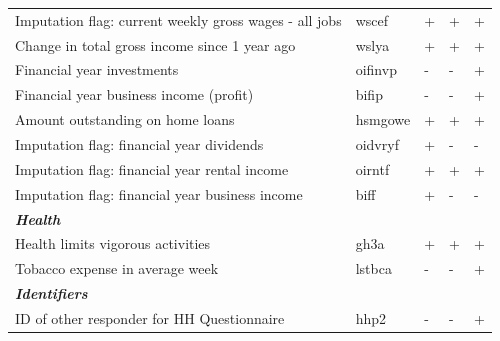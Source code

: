 \documentclass[12pt, a4paper]{article}
\begin{document}
\begin{landscape}
\begin{longtable}{p{} C{0.2\textwidth} C{0.2\textwidth} C{0.2\textwidth} C{0.2\textwidth}}
Imputation flag: current weekly gross wages - all jobs 	& 	wscef	 & 	+	 & 	+	 & 	+	\\
Change in total gross income since 1 year ago 	& 	wslya	 & 	+	 & 	+	 & 	+	\\
Financial year investments 	& 	oifinvp	 & 	-	 & 	-	 & 	+	\\
Financial year business income (profit) 	& 	bifip	 & 	-	 & 	-	 & 	+	\\
Amount outstanding on home loans 	& 	hsmgowe	 & 	+	 & 	+	 & 	+	\\
Imputation flag: financial year dividends 	& 	oidvryf	 & 	+	 & 	-	 & 	-	\\
Imputation flag: financial year rental income 	& 	oirntf	 & 	+	 & 	+	 & 	+	\\
Imputation flag: financial year business income 	& 	biff	 & 	+	 & 	-	 & 	-	\\
\textbf{\textit{Health}} 	& 		 & 		 & 		 & 		\\
Health limits vigorous activities 	& 	gh3a	 & 	+	 & 	+	 & 	+	\\
Tobacco expense in average week 	& 	lstbca	 & 	-	 & 	-	 & 	+	\\
\textbf{\textit{Identifiers}} 	& 		 & 		 & 		 & 		\\
ID of other responder for HH Questionnaire 	& 	hhp2	 & 	-	 & 	-	 & 	+	
\label{tab:mlvars}
\end{longtable}  
      
      


\end{landscape}
\end{document}
